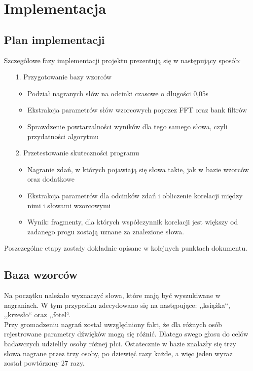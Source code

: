 \section{Implementacja}

\subsection{Plan implementacji}

Szczegółowe fazy implementacji projektu prezentują się w następujący sposób:

\begin{enumerate}
	\item [1.] Przygotowanie bazy wzorców	
	\begin{itemize}	
		\item Podział nagranych słów na odcinki czasowe o długości 0,05s
		\item Ekstrakcja parametrów słów wzorcowych poprzez FFT oraz bank filtrów
		\item Sprawdzenie powtarzalności wyników dla tego samego słowa, czyli przydatności algorytmu
	\end{itemize}

	\item [2.] Przetestowanie skuteczności programu
	\begin{itemize}	
		\item Nagranie zdań, w których pojawiają się słowa takie, jak w bazie wzorców oraz dodatkowe
		\item Ekstrakcja parametrów dla odcinków zdań i obliczenie korelacji między nimi i słowami wzorcowymi
		\item Wynik: fragmenty, dla których współczynnik korelacji jest większy od zadanego progu zostają uznane za znalezione słowa.
	\end{itemize}
\end{enumerate}

Poszczególne etapy zostały dokładnie opisane w kolejnych punktach dokumentu.


\subsection{Baza wzorców}

Na początku należało wyznaczyć słowa, które mają być wyszukiwane w nagraniach. W tym przypadku zdecydowano się na następujące: ,,książka``, ,,krzesło`` oraz ,,fotel``. \\
Przy gromadzeniu nagrań został uwzględniony fakt, że dla różnych osób rejestrowane parametry dźwięków mogą się różnić. Dlatego swego głosu do celów badawczych udzieliły osoby różnej płci. Ostatecznie w bazie znalazły się trzy słowa nagrane przez trzy osoby, po dziewięć razy każde, a więc jeden wyraz został powtórzony 27 razy.


